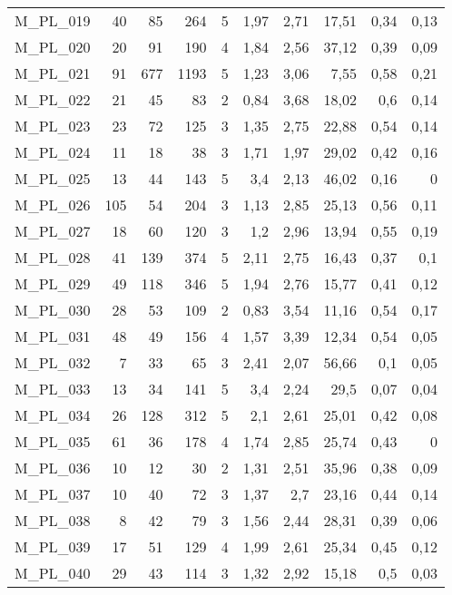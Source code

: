 \documentclass{article}
\begin{document}
\begin{table}[htbp]
\begin{tabular}{lrrrrrrrrr}
    M\_PL\_019 & 40   & 85   & 264  & 5    & 1,97 & 2,71 & 17,51 & 0,34 & 0,13 \\
    M\_PL\_020 & 20   & 91   & 190  & 4    & 1,84 & 2,56 & 37,12 & 0,39 & 0,09 \\
    M\_PL\_021 & 91   & 677  & 1193 & 5    & 1,23 & 3,06 & 7,55 & 0,58 & 0,21 \\
    M\_PL\_022 & 21   & 45   & 83   & 2    & 0,84 & 3,68 & 18,02 & 0,6  & 0,14 \\
    M\_PL\_023 & 23   & 72   & 125  & 3    & 1,35 & 2,75 & 22,88 & 0,54 & 0,14 \\
    M\_PL\_024 & 11   & 18   & 38   & 3    & 1,71 & 1,97 & 29,02 & 0,42 & 0,16 \\
    M\_PL\_025 & 13   & 44   & 143  & 5    & 3,4  & 2,13 & 46,02 & 0,16 & 0 \\
    M\_PL\_026 & 105  & 54   & 204  & 3    & 1,13 & 2,85 & 25,13 & 0,56 & 0,11 \\
    M\_PL\_027 & 18   & 60   & 120  & 3    & 1,2  & 2,96 & 13,94 & 0,55 & 0,19 \\
    M\_PL\_028 & 41   & 139  & 374  & 5    & 2,11 & 2,75 & 16,43 & 0,37 & 0,1 \\
    M\_PL\_029 & 49   & 118  & 346  & 5    & 1,94 & 2,76 & 15,77 & 0,41 & 0,12 \\
    M\_PL\_030 & 28   & 53   & 109  & 2    & 0,83 & 3,54 & 11,16 & 0,54 & 0,17 \\
    M\_PL\_031 & 48   & 49   & 156  & 4    & 1,57 & 3,39 & 12,34 & 0,54 & 0,05 \\
    M\_PL\_032 & 7    & 33   & 65   & 3    & 2,41 & 2,07 & 56,66 & 0,1  & 0,05 \\
    M\_PL\_033 & 13   & 34   & 141  & 5    & 3,4  & 2,24 & 29,5 & 0,07 & 0,04 \\
    M\_PL\_034 & 26   & 128  & 312  & 5    & 2,1  & 2,61 & 25,01 & 0,42 & 0,08 \\
    M\_PL\_035 & 61   & 36   & 178  & 4    & 1,74 & 2,85 & 25,74 & 0,43 & 0 \\
    M\_PL\_036 & 10   & 12   & 30   & 2    & 1,31 & 2,51 & 35,96 & 0,38 & 0,09 \\
    M\_PL\_037 & 10   & 40   & 72   & 3    & 1,37 & 2,7  & 23,16 & 0,44 & 0,14 \\
    M\_PL\_038 & 8    & 42   & 79   & 3    & 1,56 & 2,44 & 28,31 & 0,39 & 0,06 \\
    M\_PL\_039 & 17   & 51   & 129  & 4    & 1,99 & 2,61 & 25,34 & 0,45 & 0,12 \\
    M\_PL\_040 & 29   & 43   & 114  & 3    & 1,32 & 2,92 & 15,18 & 0,5  & 0,03 \\

\end{tabular}
\end{table}
\end{document}
